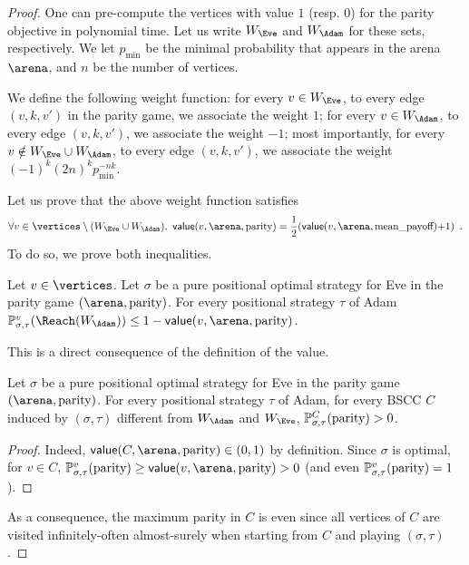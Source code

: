 \begin{proof}
  One can pre-compute the vertices with value $1$ (resp. $0$) for the
  parity objective in polynomial time.
  Let us
  write $W_\Eve$ and $W_\Adam$ for these sets, respectively. We let
  $p_{\min}$ be the minimal probability that appears in the arena
  $\arena$, and $n$ be the number of vertices.
  
  We define the following weight function: for every $v \in W_\Eve$,
  to every edge $(v,k,v')$ in the parity game, we associate the weight
  $1$; for every $v \in W_\Adam$, to every edge $(v,k,v')$, we associate
  the weight $-1$; most importantly, for every
  $v \notin W_\Eve \cup W_\Adam$, to every edge $(v,k,v')$, we associate the
  weight $(-1)^k (2n)^k p_{\min}^{-nk}$.

  Let us prove that the above weight function satisfies
  \[
    \forall v \in \vertices \setminus (W_\Eve \cup W_\Adam),\ 
    \mathsf{value}(v,\arena,\textrm{parity}) = \frac 1 2
    (\mathsf{value}(v,\arena,\textrm{mean\_payoff}) {+} 1)\enspace.
  \]
  To do so, we prove both inequalities.

  
  \begin{lemma} Let $v \in \vertices$. Let $\sigma$ be a pure
    positional optimal strategy for Eve in the parity game
    $(\arena,\textrm{parity})$. For every positional strategy $\tau$
    of Adam
    $\probm_{\sigma,\tau}^v(\Reach(W_\Adam)) \leq 1 -
    \mathsf{value}(v,\arena,\textrm{parity})$.
    \end{lemma}
    This is a direct consequence of the definition of the value.

    \begin{lemma}
      Let $\sigma$ be a pure positional optimal strategy for Eve in
      the parity game $(\arena,\textrm{parity})$. For every positional
      strategy $\tau$ of Adam, for every BSCC $C$ induced by
      $(\sigma,\tau)$ different from $W_\Adam$ and $W_\Eve$,
      $\mathbb{P}_{\sigma,\tau}^C(\textrm{parity}) >0$.
    \end{lemma}
    \begin{proof}
      Indeed, $\mathsf{value}(C,\arena,\textrm{parity}) \in (0,1)$ by
      definition. Since $\sigma$ is optimal, for $v \in C$,
      $\probm_{\sigma,\tau}^v(\textrm{parity}) \geq
      \mathsf{value}(v,\arena,\textrm{parity}) >0$ (and even
      $\mathbb{P}_{\sigma,\tau}^v(\textrm{parity})=1$).
    \end{proof}
    As a consequence, the maximum parity in $C$ is even since all
    vertices of $C$ are visited infinitely-often almost-surely when
    starting from $C$ and playing $(\sigma,\tau)$.


\end{proof}
